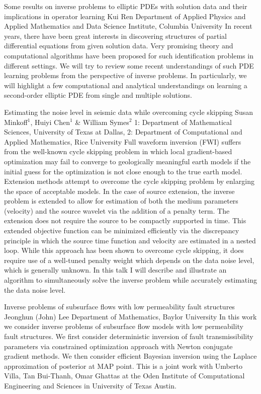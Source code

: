\begin{addmargin}[2em]{0em}
\vspace{2ex}
\abs
{Some results on inverse problems to elliptic {PDE}s with solution data and their implications in operator learning}
{Kui Ren}
{Department of Applied Physics and Applied Mathematics and Data Science Institute, Columbia University}
{In recent years, there have been great interests in discovering structures of partial differential equations from given solution data. Very promising theory and computational algorithms have been proposed for such identification problems in different settings. We will try to review some recent understandings of such PDE learning problems from the perspective of inverse problems. In particularly, we will highlight a few computational and analytical understandings on learning a second-order elliptic PDE from single and multiple solutions.}


\vspace{1.5ex}
\abs
{Estimating the noise level in seismic data while overcoming cycle skipping}
{Susan Minkoff$^{1}$, Huiyi Chen$^{1}$ \& William Symes$^{2}$}
{1: Department of Mathematical Sciences, University of Texas at Dallas, 2:  Department of Computational and Applied Mathematics, Rice University}
{Full waveform inversion (FWI) suffers from the well-known cycle skipping problem in which local gradient-based optimization may fail to converge to geologically meaningful earth models if the initial guess for the optimization is not close enough to the true earth model. Extension methods attempt to overcome the cycle skipping problem by enlarging the space of acceptable models. In the case of source extension, the inverse problem is extended to allow for estimation of both the medium parameters (velocity) and the source wavelet via the addition of a penalty term. The extension does not require the source to be compactly supported in time. This extended objective function can be minimized efficiently  via the discrepancy principle in which the source time function and velocity are estimated in a nested loop. While this approach has been shown to overcome cycle skipping, it does require use of a well-tuned penalty weight which depends on the data noise level, which is generally unknown. In this talk I will describe and illustrate an algorithm to simultaneously solve the inverse problem while accurately estimating the data noise level.}


\vspace{1.5ex}
\abs
{Inverse problems of subsurface flows with low permeability fault structures}
{Jeonghun (John) Lee}
{Department of Mathematics, Baylor University}
{In this work we consider inverse problems of subsurface flow models with low permeability fault structures. We first consider deterministic inversion of fault transmissibility parameters via constrained optimization approach with Newton conjugate gradient methods. We then consider efficient Bayesian inversion using the Laplace approximation of posterior at MAP point. This is a joint work with Umberto Villa, Tan Bui-Thanh, Omar Ghattas at the Oden Institute of Computational Engineering and Sciences in University of Texas Austin.}



\end{addmargin}
